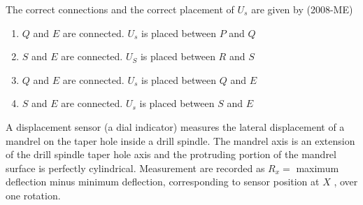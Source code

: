  The correct connections and the correct placement of $U_s$
 are given by \hfill(2008-ME)
 \begin{enumerate}
         \item $Q$ and $E$ are connected. $U_s$ is placed between $P$ and $Q$
         \item $S$ and $E$ are connected. $U_S$ is placed between $R$ and $S$
         \item $Q$ and $E$ are connected. $U_s$ is placed between $Q$ and $E$
         \item $S$ and $E$ are connected. $U_s$ is placed between $S$ and $E$
 \end{enumerate}
 \item A displacement sensor (a dial indicator) measures the lateral displacement of a mandrel on the taper hole inside a drill spindle. The mandrel axis is an extension of the drill spindle taper hole axis and the protruding portion of the mandrel surface is perfectly cylindrical. Measurement are recorded as $R_x = $
 maximum deflection minus minimum deflection, corresponding to sensor position at $X$
, over one rotation.
